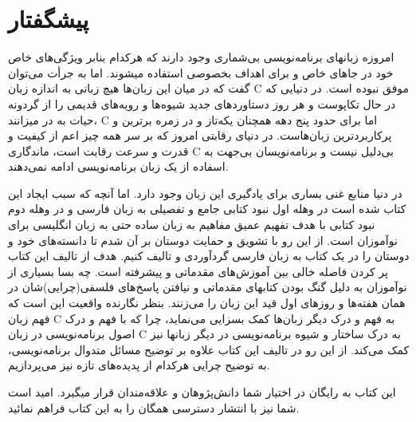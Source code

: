 \chapter*{پیشگفتار}
امروزه زبانهای برنامه‌نویسی بی‌شماری وجود دارند که هرکدام بنابر ویژگی‌های خاص خود در جاهای خاص و برای اهداف بخصوصی استفاده میشوند. اما به جرأت می‌توان گفت که در میان این زبان‌ها هیچ زبانی به اندازه زبان C موفق نبوده است. در دنیایی که در حال تکاپوست و هر روز دستاوردهای جدید شیوه‌ها و رویه‌های قدیمی را از گردونه حیات به در میزانند، C اما برای حدود پنج دهه همچنان یکه‌تاز و در زمره برترین و پرکاربردترین زبان‌هاست. در دنیای رقابتی امروز که بر سر همه چیز اعم از کیفیت و قدرت و سرعت رقابت است، ماندگاری C بی‌دلیل نیست و برنامه‌نویسان بی‌جهت به اسفاده از یک زبان برنامه‌نویسی ادامه نمی‌دهند.

در دنیا منابع غنی بساری برای یادگیری این زبان وجود دارد. اما آنچه که سبب ایجاد این کتاب شده است در وهله اول نبود کتابی جامع و تفصیلی به زبان فارسی و در وهله دوم نبود کتابی با هدف تفهیم عمیق مفاهیم به زبان ساده حتی به زبان انگلیسی برای نوآموزان است. از این رو با تشویق و حمایت دوستان بر آن شدم تا دانسته‌های خود و دوستان را در یک کتاب به زبان فارسی گردآوردی و تالیف کنیم. هدف از تالیف این کتاب پر کردن فاصله خالی بین آموزش‌های مقدماتی و پیشرفته است. چه بسا بسیاری از نوآموزان به دلیل گنگ بودن کتابهای مقدماتی و نیافتن پاسخ‌های فلسفی(چرایی)شان در همان هفته‌ها و روزهای اول قید این زبان را می‌زنند. بنظر نگارنده واقعیت این است که فهم زبان C به فهم و درک دیگر زبان‌ها کمک بسزایی می‌نماید، چرا که با فهم و درک اصول برنامه‌نویسی در زبان C به درک ساختار و شیوه برنامه‌نویسی در دیگر زبانها نیز کمک می‌کند. از این رو در تالیف این کتاب علاوه بر توضیح مسائل متدوال برنامه‌نویسی، به توضیح چرایی هرکدام از پدیده‌های تازه نیز می‌پردازیم. 

این کتاب به رایگان در اختیار شما دانش‌پژوهان و علاقه‌مندان قرار میگیرد. امید است شما نیز با انتشار دسترسی همگان را به این کتاب فراهم نمائید.
